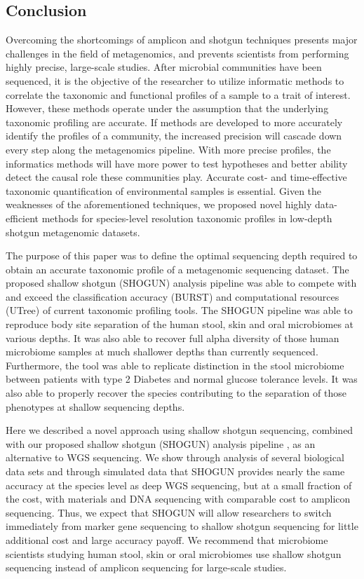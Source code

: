 \subsection{Conclusion}

Overcoming the shortcomings of amplicon and shotgun techniques presents major challenges in the field of metagenomics, and prevents scientists from performing highly precise, large-scale studies. After microbial communities have been sequenced, it is the objective of the researcher to utilize informatic methods to correlate the taxonomic and functional profiles of a sample to a trait of interest. However, these methods operate under the assumption that the underlying taxonomic profiling are accurate. If methods are developed to more accurately identify the profiles of a community, the increased precision will cascade down every step along the metagenomics pipeline. With more precise profiles, the informatics methods will have more power to test hypotheses and better ability detect the causal role these communities play. Accurate cost- and time-effective taxonomic quantification of environmental samples is essential. Given the weaknesses of the aforementioned techniques, we proposed novel highly data-efficient methods for species-level resolution taxonomic profiles in low-depth shotgun metagenomic datasets.

The purpose of this paper was to define the optimal sequencing depth required to obtain an accurate taxonomic profile of a metagenomic sequencing dataset. The proposed shallow shotgun (SHOGUN) analysis pipeline was able to compete with and exceed the classification accuracy (BURST) and computational resources (UTree) of current taxonomic profiling tools. The SHOGUN pipeline was able to reproduce body site separation of the human stool, skin and oral microbiomes at various depths. It was also able to recover full alpha diversity of those human microbiome samples at much shallower depths than currently sequenced. Furthermore, the tool was able to replicate distinction in the stool microbiome between patients with type 2 Diabetes and normal glucose tolerance levels. It was also able to properly recover the species contributing to the separation of those phenotypes at shallow sequencing depths.

Here we described a novel approach using shallow shotgun sequencing, combined with our proposed shallow shotgun (SHOGUN) analysis pipeline \cite{benjamin_hillmann_knights-lab/shogun:_2017}, as an alternative to WGS sequencing. We show through analysis of several biological data sets and through simulated data that SHOGUN provides nearly the same accuracy at the species level as deep WGS sequencing, but at a small fraction of the cost, with materials and DNA sequencing with comparable cost to amplicon sequencing. Thus, we expect that SHOGUN will allow researchers to switch immediately from marker gene sequencing to shallow shotgun sequencing for little additional cost and large accuracy payoff. We recommend that microbiome scientists studying human stool, skin or oral microbiomes use shallow shotgun sequencing instead of amplicon sequencing for large-scale studies.


